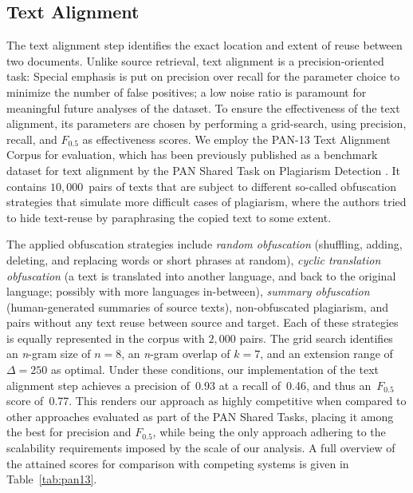 \subsection*{Text Alignment}

The text alignment step identifies the exact location and extent of reuse between two documents. Unlike source retrieval, text alignment is a precision-oriented task: Special emphasis is put on precision over recall for the parameter choice to minimize the number of false positives; a low noise ratio is paramount for meaningful future analyses of the dataset. To ensure the effectiveness of the text alignment, its parameters are chosen by performing a grid-search, using precision, recall, and $F_{0.5}$ as effectiveness scores. We employ the PAN-13 Text Alignment Corpus for evaluation, which has been previously published as a benchmark dataset for text alignment by the PAN Shared Task on Plagiarism Detection \cite{potthast:2013}. It contains $10,000$~pairs of texts that are subject to different so-called obfuscation strategies that simulate more difficult cases of plagiarism, where the authors tried to hide text-reuse by paraphrasing the copied text to some extent. 

The applied obfuscation strategies include \emph{random obfuscation} (shuffling, adding, deleting, and replacing words or short phrases at random), \emph{cyclic translation obfuscation} (a text is translated into another language, and back to the original language; possibly with more languages in-between), \emph{summary obfuscation} (human-generated summaries of source texts), non-obfuscated plagiarism, and pairs without any text reuse between source and target. Each of these strategies is equally represented in the corpus with $2,000$ pairs. The grid search identifies an \emph{n}-gram size of $n = 8$, an \emph{n}-gram overlap of $k = 7$, and an extension range of $\Delta = 250$ as optimal. Under these conditions, our implementation of the text alignment step achieves a precision of~0.93 at a recall of~0.46, and thus an~$F_{0.5}$ score of~0.77. This renders our approach as highly competitive when compared to other approaches evaluated as part of the PAN Shared Tasks, placing it among the best for precision and $F_{0.5}$, while being the only approach adhering to the scalability requirements imposed by the scale of our analysis. A full overview of the attained scores for comparison with competing systems is given in Table~\ref{tab:pan13}.

